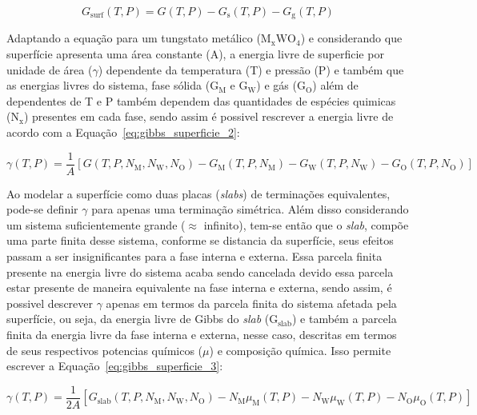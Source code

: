 \begin{equation}
G_{\text{surf}}(T,P) = G(T,P) - G_{\text{s}}(T,P) - G_{\text{g}}(T,P)
\label{eq:gibbs_superficie_1}
\end{equation}

Adaptando a equação para um tungstato metálico (M$_{\text{x}}\text{WO}_4$) e considerando que superfície apresenta uma área constante (A), a energia livre de superficie por unidade de área (\( \gamma \)) dependente da temperatura (T) e pressão (P) e também que as energias livres do sistema, fase sólida (G$_{\text{M}}$ e G$_{\text{W}}$) e gás (G$_{\text{O}}$) além de dependentes de T e P também dependem das quantidades de espécies quimicas (N$_{\text{x}}$) presentes em cada fase, sendo assim é possivel rescrever a energia livre de acordo com a Equação~\ref{eq:gibbs_superficie_2}:

\begin{equation}
\gamma(T,P) = \frac{1}{A} \left[ G(T,P,N_{\text{M}},N_{\text{W}},N_{\text{O}}) - G_{\text{M}}(T,P,N_{\text{M}}) - G_{\text{W}}(T,P,N_{\text{W}}) - G_{\text{O}}(T,P,N_{\text{O}}) \right]
\label{eq:gibbs_superficie_2}
\end{equation}

Ao modelar a superfície como duas placas (\textit{slabs}) de terminações equivalentes, pode-se definir $\gamma$ para apenas uma terminação simétrica. Além disso considerando um sistema suficientemente grande ($\approx$ infinito), tem-se então que o \textit{slab}, compõe uma parte finita desse sistema, conforme se distancia da superfície, seus efeitos passam a ser insignificantes para a fase interna e externa. Essa parcela finita  presente na energia livre do sistema acaba sendo cancelada devido essa parcela estar presente de maneira equivalente na fase interna e externa, sendo assim, é possivel descrever $\gamma$ apenas em termos da parcela finita do sistema afetada pela superfície, ou seja, da energia livre de Gibbs do \textit{slab} (G$_{\text{slab}}$) e também a parcela finita da energia livre da fase interna e externa, nesse caso, descritas em termos de seus respectivos potencias químicos ($\mu$) e composição química. Isso permite escrever a Equação~\ref{eq:gibbs_superficie_3}:

\begin{equation}
\gamma(T,P) = \frac{1}{2A} \left[ G_{\text{slab}}(T,P,N_{\text{M}},N_{\text{W}},N_{\text{O}}) - N_{\text{M}}\mu_{\text{M}}(T,P) - N_{\text{W}}\mu_{\text{W}}(T,P) - N_{\text{O}}\mu_{\text{O}}(T,P) \right]
\label{eq:gibbs_superficie_3}
\end{equation}

